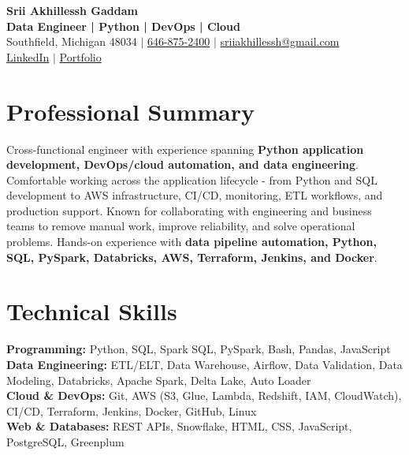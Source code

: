 \documentclass[letterpaper,10pt]{article}
\begin{document}
\fontsize{9.35pt}{10.45pt}\selectfont

\begin{center}
    {\LARGE \textbf{Srii Akhillessh Gaddam}} \\[-1pt]
    \textbf{Data Engineer | Python | DevOps | Cloud} \\[2pt]
    Southfield, Michigan 48034 $|$
    \href{tel:6468752400}{646-875-2400} $|$
    \href{mailto:sriiakhillessh@gmail.com}{sriiakhillessh@gmail.com} \\[1pt]
    \href{https://www.linkedin.com/in/srii-akhiilessh-gaddam-b48668191/}{LinkedIn} $|$
    \href{https://sriiakhillesshg.github.io/portfolio/}{Portfolio}
\end{center}
\vspace{-8pt}

\section{Professional Summary}
\small{Cross-functional engineer with experience spanning \textbf{Python application development, DevOps/cloud automation, and data engineering}. Comfortable working across the application lifecycle - from Python and SQL development to AWS infrastructure, CI/CD, monitoring, ETL workflows, and production support. Known for collaborating with engineering and business teams to remove manual work, improve reliability, and solve operational problems. Hands-on experience with \textbf{data pipeline automation, Python, SQL, PySpark, Databricks, AWS, Terraform, Jenkins, and Docker}.}

\section{Technical Skills}
\small{
\textbf{Programming:} Python, SQL, Spark SQL, PySpark, Bash, Pandas, JavaScript \\
\textbf{Data Engineering:} ETL/ELT, Data Warehouse, Airflow, Data Validation, Data Modeling, Databricks, Apache Spark, Delta Lake, Auto Loader \\
\textbf{Cloud \& DevOps:} Git, AWS (S3, Glue, Lambda, Redshift, IAM, CloudWatch), CI/CD, Terraform, Jenkins, Docker, GitHub, Linux \\
\textbf{Web \& Databases:} REST APIs, Snowflake, HTML, CSS, JavaScript, PostgreSQL, Greenplum
}
\end{document}
